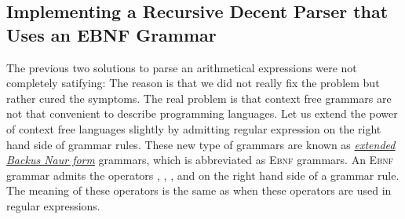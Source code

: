 
\subsection{Implementing a Recursive Decent Parser that Uses an \textsc{EBNF} Grammar}
The previous two solutions to parse an arithmetical expressions were not completely
satifying:  The reason is that we did not really fix the problem but rather cured the
symptoms.  The real problem is that context free grammars are not that convenient to
describe programming languages.  Let us extend the power of context free languages
slightly by admitting regular expression on the right hand side of grammar rules.  
These new type of grammars are known as
\href{http://en.wikipedia.org/wiki/Extended_Backus_Naur_Form}{\emph{extended Backus Naur form}}
grammars, which 
is abbreviated as \textsc{Ebnf} grammars.  An \textsc{Ebnf} grammar admits the operators
\squoted{*}, , \squoted{+}, and \squoted{|} on the right hand side of a grammar
rule.  The meaning of these operators is the same as when these operators are used in 
regular expressions.

